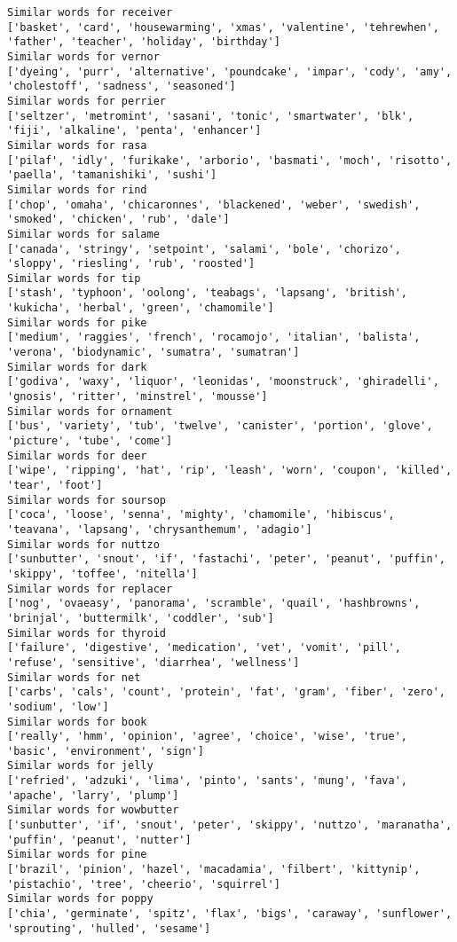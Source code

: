 \documentclass[11pt]{article}
\begin{document}
\begin{Verbatim}[commandchars=\\\{\}]
Similar words for receiver
['basket', 'card', 'housewarming', 'xmas', 'valentine', 'tehrewhen', 'father', 'teacher', 'holiday', 'birthday']
Similar words for vernor
['dyeing', 'purr', 'alternative', 'poundcake', 'impar', 'cody', 'amy', 'cholestoff', 'sadness', 'seasoned']
Similar words for perrier
['seltzer', 'metromint', 'sasani', 'tonic', 'smartwater', 'blk', 'fiji', 'alkaline', 'penta', 'enhancer']
Similar words for rasa
['pilaf', 'idly', 'furikake', 'arborio', 'basmati', 'moch', 'risotto', 'paella', 'tamanishiki', 'sushi']
Similar words for rind
['chop', 'omaha', 'chicaronnes', 'blackened', 'weber', 'swedish', 'smoked', 'chicken', 'rub', 'dale']
Similar words for salame
['canada', 'stringy', 'setpoint', 'salami', 'bole', 'chorizo', 'sloppy', 'riesling', 'rub', 'roosted']
Similar words for tip
['stash', 'typhoon', 'oolong', 'teabags', 'lapsang', 'british', 'kukicha', 'herbal', 'green', 'chamomile']
Similar words for pike
['medium', 'raggies', 'french', 'rocamojo', 'italian', 'balista', 'verona', 'biodynamic', 'sumatra', 'sumatran']
Similar words for dark
['godiva', 'waxy', 'liquor', 'leonidas', 'moonstruck', 'ghiradelli', 'gnosis', 'ritter', 'minstrel', 'mousse']
Similar words for ornament
['bus', 'variety', 'tub', 'twelve', 'canister', 'portion', 'glove', 'picture', 'tube', 'come']
Similar words for deer
['wipe', 'ripping', 'hat', 'rip', 'leash', 'worn', 'coupon', 'killed', 'tear', 'foot']
Similar words for soursop
['coca', 'loose', 'senna', 'mighty', 'chamomile', 'hibiscus', 'teavana', 'lapsang', 'chrysanthemum', 'adagio']
Similar words for nuttzo
['sunbutter', 'snout', 'if', 'fastachi', 'peter', 'peanut', 'puffin', 'skippy', 'toffee', 'nitella']
Similar words for replacer
['nog', 'ovaeasy', 'panorama', 'scramble', 'quail', 'hashbrowns', 'brinjal', 'buttermilk', 'coddler', 'sub']
Similar words for thyroid
['failure', 'digestive', 'medication', 'vet', 'vomit', 'pill', 'refuse', 'sensitive', 'diarrhea', 'wellness']
Similar words for net
['carbs', 'cals', 'count', 'protein', 'fat', 'gram', 'fiber', 'zero', 'sodium', 'low']
Similar words for book
['really', 'hmm', 'opinion', 'agree', 'choice', 'wise', 'true', 'basic', 'environment', 'sign']
Similar words for jelly
['refried', 'adzuki', 'lima', 'pinto', 'sants', 'mung', 'fava', 'apache', 'larry', 'plump']
Similar words for wowbutter
['sunbutter', 'if', 'snout', 'peter', 'skippy', 'nuttzo', 'maranatha', 'puffin', 'peanut', 'nutter']
Similar words for pine
['brazil', 'pinion', 'hazel', 'macadamia', 'filbert', 'kittynip', 'pistachio', 'tree', 'cheerio', 'squirrel']
Similar words for poppy
['chia', 'germinate', 'spitz', 'flax', 'bigs', 'caraway', 'sunflower', 'sprouting', 'hulled', 'sesame']

\end{Verbatim}
\end{document}
